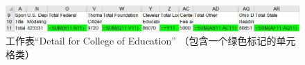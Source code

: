 \begin{figure}[tp]
    \centering
    \includegraphics[width = \columnwidth]{figure/figure7.jpeg}
    \caption{工作表“Detail for College of Education” （包含一个绿色标记的单元格类）}
    \label{figure7}
\end{figure}